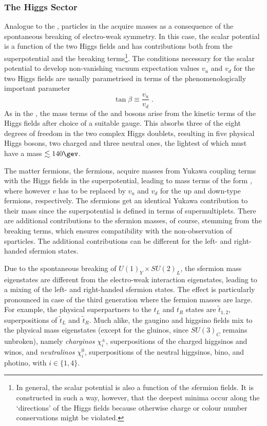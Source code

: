 \subsubsection{The Higgs Sector}
Analogue to the \sm, particles in the \mssm acquire masses as a consequence of the spontaneous breaking of electro-weak symmetry.
In this case, the scalar potential is a function of the two Higgs fields and has contributions both from the superpotential and the breaking terms\footnote{In general, the scalar potential is also a function of the sfermion fields. It is constructed in such a way, however, that the deepest minima occur along the `directions' of the Higgs fields because otherwise charge or colour number conservations might be violated.}.
The conditions necessary for the scalar potential to develop non-vanishing vacuum expectation values $v_{u}$ and $v_{d}$ for the two Higgs fields are usually parametrised in terms of the phenomenologically important parameter
\begin{equation*}
  \tan\beta \equiv \frac{v_{u}}{v_{d}} \;.
\end{equation*}
As in the \sm, the mass terms of the \W and \Z bosons arise from the kinetic terms of the Higgs fields after choice of a suitable gauge.
This absorbs three of the eight degrees of freedom in the two complex Higgs doublets, resulting in five physical Higgs bosons, two charged and three neutral ones, the lightest of which must have a mass \mbox{$\lesssim140\gev$}.

The matter fermions, \ie the \sm fermions, acquire masses from Yukawa coupling terms with the Higgs fields in the superpotential, leading to mass terms of the form , where however $v$ has to be replaced by $v_{u}$ and $v_{d}$ for the up and down-type fermions, respectively.
The sfermions get an identical Yukawa contribution to their mass since the superpotential is defined in terms of supermultiplets.
There are additional contributions to the sfermion masses, of course, stemming from the \susy breaking terms, which ensures compatibility with the non-observation of sparticles.
The additional contributions can be different for the left- and right-handed sfermion states.

Due to the spontaneous breaking of \mbox{$U(1)_{Y}\times SU(2)_{L}$}, the sfermion mass eigenstates are different from the electro-weak interaction eigenstates, leading to a mixing of the left- and right-handed sfermion states.
The effect is particularly pronounced in case of the third generation where the fermion masses are large.
For example, the physical superpartners to the $t_{L}$ and $t_{R}$ states are $\tilde{t}_{1,2}$, superpositions of $\tilde{t}_{L}$ and $\tilde{t}_{R}$.
Much alike, the gaugino and higgsino fields mix to the physical mass eigenstates (except for the gluinos, since $SU(3)_{C}$ remains unbroken), namely \emph{charginos} $\chi^{\pm}_{i}$, superpositions of the charged higgsinos and winos, and \emph{neutralinos} $\chi^{0}_{i}$, superpositions of the neutral higgsinos, bino, and photino, with \mbox{$i\in\{1,4\}$}.


